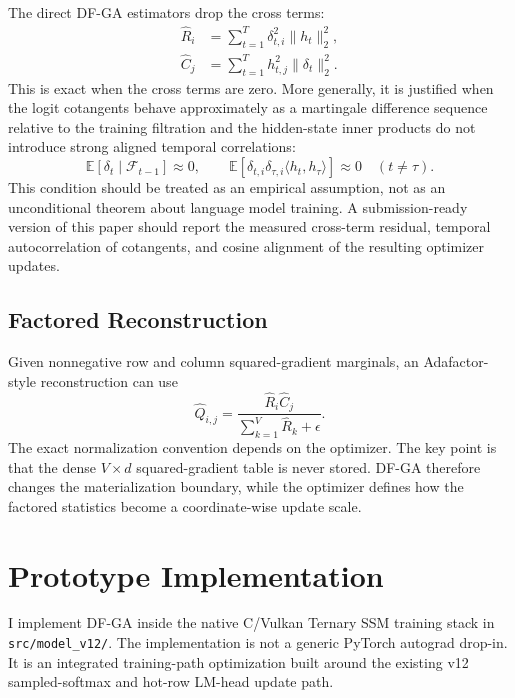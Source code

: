 \documentclass{article}
\begin{document}
The direct DF-GA estimators drop the cross terms:
\begin{align}
  \widehat{R}_i &= \sum_{t=1}^T \delta_{t,i}^2 \|h_t\|_2^2, \\
  \widehat{C}_j &= \sum_{t=1}^T h_{t,j}^2 \|\delta_t\|_2^2.
\end{align}
This is exact when the cross terms are zero. More generally, it is justified
when the logit cotangents behave approximately as a martingale difference
sequence relative to the training filtration and the hidden-state inner
products do not introduce strong aligned temporal correlations:
\begin{equation}
  \mathbb{E}[\delta_t \mid \mathcal{F}_{t-1}] \approx 0,
  \qquad
  \mathbb{E}[\delta_{t,i}\delta_{\tau,i}
  \langle h_t,h_\tau\rangle] \approx 0
  \quad (t \ne \tau).
\end{equation}
This condition should be treated as an empirical assumption, not as an
unconditional theorem about language model training. A submission-ready version
of this paper should report the measured cross-term residual, temporal
autocorrelation of cotangents, and cosine alignment of the resulting optimizer
updates.

\subsection{Factored Reconstruction}

Given nonnegative row and column squared-gradient marginals, an
Adafactor-style reconstruction can use
\begin{equation}
  \widehat{Q}_{i,j}
  =
  \frac{\widehat{R}_i \widehat{C}_j}
       {\sum_{k=1}^V \widehat{R}_k + \epsilon}.
\end{equation}
The exact normalization convention depends on the optimizer. The key point is
that the dense $V \times d$ squared-gradient table is never stored. DF-GA
therefore changes the materialization boundary, while the optimizer defines how
the factored statistics become a coordinate-wise update scale.

\section{Prototype Implementation}

I implement DF-GA inside the native C/Vulkan Ternary SSM training stack in
\texttt{src/model\_v12/}. The implementation is not a generic PyTorch
autograd drop-in. It is an integrated training-path optimization built around
the existing v12 sampled-softmax and hot-row LM-head update path.
\end{document}
